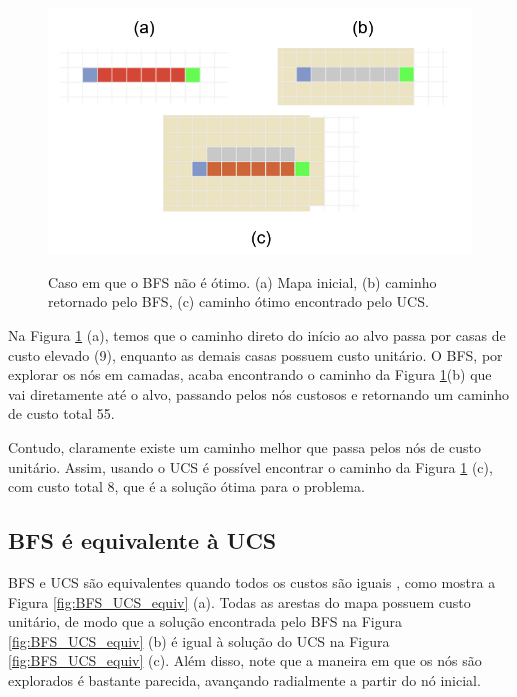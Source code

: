 \documentclass[letterpaper]{article} %
\begin{document}
\begin{figure}[htb]
	\centering 
    \caption{Caso em que o BFS não é ótimo. (a) Mapa inicial, (b)
	caminho retornado pelo BFS, (c) caminho ótimo encontrado pelo UCS.}
	\includegraphics[width=\columnwidth]{images/BFS_nao_otimo.png}
	\label{fig:BFS_nao_otimo}
\end{figure}

Na Figura \ref{fig:BFS_nao_otimo} (a), temos que o caminho direto do início ao alvo 
passa por casas de custo elevado (9), enquanto as demais casas possuem custo unitário.
O BFS, por explorar os nós em camadas, acaba encontrando o caminho da Figura \ref{fig:BFS_nao_otimo}(b) que vai diretamente 
até o alvo, passando pelos nós custosos e retornando um caminho de custo total 55.

Contudo, claramente existe um caminho melhor que passa pelos nós de custo unitário.
Assim, usando o UCS é possível encontrar o caminho da Figura \ref{fig:BFS_nao_otimo} (c), 
com custo total 8, que é a solução ótima para o problema.

\subsection{BFS é equivalente à UCS}

BFS e UCS são equivalentes quando todos os custos são iguais \cite{russell2020aima}, como mostra 
a Figura \ref{fig:BFS_UCS_equiv} (a). Todas as arestas do mapa possuem
 custo unitário, de modo que a solução encontrada pelo BFS na Figura \ref{fig:BFS_UCS_equiv} (b) 
 é igual à solução do UCS na Figura \ref{fig:BFS_UCS_equiv} (c). Além disso, note que 
 a maneira em que os nós são explorados é bastante parecida, avançando radialmente 
 a partir do nó inicial.
\end{document}
